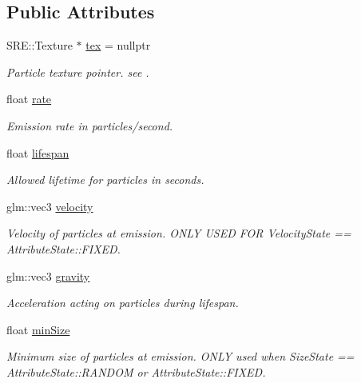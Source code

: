 \subsection*{Public Attributes}
\begin{DoxyCompactItemize}
\item 
S\+R\+E\+::\+Texture $\ast$ \hyperlink{struct_mason_1_1_particle_emitter_config_a660e9a7613b158ac36bfc4ffe8b5f610}{tex} = nullptr
\begin{DoxyCompactList}\small\item\em Particle texture pointer. see . \end{DoxyCompactList}\item 
float \hyperlink{struct_mason_1_1_particle_emitter_config_abc0c7231f9134e3b0456d22ee8d5c8a2}{rate}
\begin{DoxyCompactList}\small\item\em Emission rate in particles/second. \end{DoxyCompactList}\item 
float \hyperlink{struct_mason_1_1_particle_emitter_config_a856b3906e25a7d41eb9bc7e37a91ef93}{lifespan}
\begin{DoxyCompactList}\small\item\em Allowed lifetime for particles in seconds. \end{DoxyCompactList}\item 
glm\+::vec3 \hyperlink{struct_mason_1_1_particle_emitter_config_af8c3efa305e0a0636576bebe60938c80}{velocity}
\begin{DoxyCompactList}\small\item\em Velocity of particles at emission. O\+N\+LY U\+S\+ED F\+OR Velocity\+State == Attribute\+State\+::\+F\+I\+X\+ED. \end{DoxyCompactList}\item 
glm\+::vec3 \hyperlink{struct_mason_1_1_particle_emitter_config_ad5fa0930e4e3f5d8c9de1324a854e63a}{gravity}
\begin{DoxyCompactList}\small\item\em Acceleration acting on particles during lifespan. \end{DoxyCompactList}\item 
float \hyperlink{struct_mason_1_1_particle_emitter_config_ab46ccc780e60c6b7006749058654455f}{min\+Size}
\begin{DoxyCompactList}\small\item\em Minimum size of particles at emission. O\+N\+LY used when Size\+State == Attribute\+State\+::\+R\+A\+N\+D\+OM or Attribute\+State\+::\+F\+I\+X\+ED. \end{DoxyCompactList}\item 

\end{DoxyCompactItemize}

